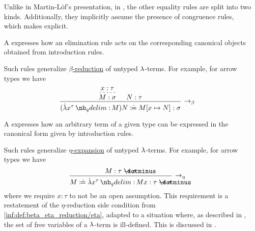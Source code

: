 \begin{remark}
\begin{thmenum}
    Unlike in Martin-L\"of's presentation, in \cite[27]{UnivalentFoundationsProgram2024OctoberHoTT}, the other equality rules are split into two kinds. Additionally, they implicitly assume the presence of congruence rules, which  makes explicit.

    \begin{thmenum}
       A  expresses how an elimination rule acts on the corresponding canonical objects obtained from introduction rules.

      Such rules generalize \hyperref[def:beta_eta_reduction]{\( \beta \)-reduction} of untyped \( {\mathrm \lambda} \)-terms. For example, for arrow types we have
      \begin{equation*}
        \begin{prooftree}
          \hypo{ x: \tau }
          \infer[dashed]1{ M: \sigma }

          \hypo{ N: \tau }
          \infer2[\ensuremath{ \rightarrow_\beta }]{ (\qabs {x^\tau} M) N \syndefeq M[x \mapsto N]: \sigma }.
        \end{prooftree}
      \end{equation*}

       A  expresses how an arbitrary term of a given type can be expressed in the canonical form given by introduction rules.

      Such rules generalize \hyperref[def:beta_eta_reduction]{\( \eta \)-expansion} of untyped \( {\mathrm \lambda} \)-terms. For example, for arrow types we have
      \begin{equation*}
        \begin{prooftree}
          \hypo{ M: \tau \synimplies \sigma }
          \infer1[\ensuremath{ \rightarrow_\eta }]{ M \syndefeq \qabs {x^\tau} M x: \tau \synimplies \sigma },
        \end{prooftree}
      \end{equation*}
      where we require \( x: \tau \) to not be an open assumption. This requirement is a restatement of the \( \eta \)-reduction side condition from \ref{inf:def:beta_eta_reduction/eta}, adapted to a situation where, as described in , the set of free variables of a \( {\mathrm \lambda} \)-term is ill-defined. This is discussed in \cite{MathSE:dependent_type_theory_and_free_variables}.


\end{thmenum}
\end{thmenum}
\end{remark}
